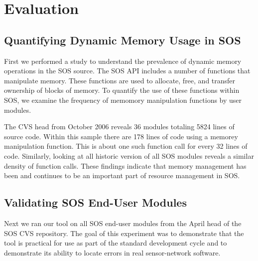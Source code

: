 \section{Evaluation}
\label{sec:eval}

\subsection{Quantifying Dynamic Memory Usage in SOS}

First we performed a study to understand the prevalence of dynamic
memory operations in the SOS source.  The SOS API includes a number of
functions that manipulate memory.  These functions are used to allocate, free,
and transfer ownership of blocks of memory.  To quantify the use of these
functions within SOS, we examine the frequency of memomory manipulation
functions by user modules. 

The CVS head from October 2006 reveals 36 modules totaling 5824 lines of
source code.  Within this sample there are 178 lines of code using a memorey
manipulation function.  This is about one such function call for every 32
lines of code.  Similarly, looking at all historic version of all SOS modules
reveals a similar density of function calls.  These findings indicate that
memory management has been and continues to be an important part of resource
management in SOS.


\subsection{Validating SOS End-User Modules}

Next we ran our tool on all SOS end-user modules from the April head
of the SOS CVS repository.  The goal of this experiment was to
demonstrate that the tool is practical for use as part of the standard
development cycle and to demonstrate its ability to locate errors in
real sensor-network software.

%

